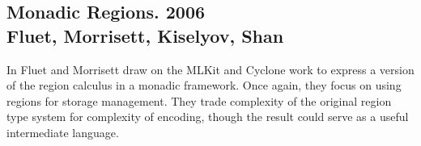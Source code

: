 \subsection{Monadic Regions. 2006
	\\ Fluet, Morrisett, Kiselyov, Shan}

In \cite{fluet:monadic-regions} Fluet and Morrisett draw on the MLKit and Cyclone work to express a version of the region calculus in a monadic framework. Once again, they focus on using regions for storage management. They trade complexity of the original region type system for complexity of encoding, though the result could serve as a useful intermediate language.


